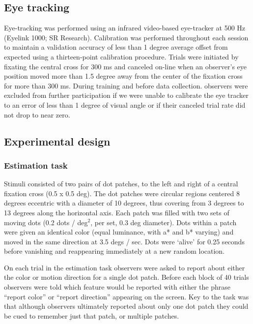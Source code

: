 \documentclass{report}
\begin{document}
\subsection{Eye tracking}

Eye-tracking was performed using an infrared video-based eye-tracker at 500 Hz (Eyelink 1000; SR Research). Calibration was performed throughout each session to maintain a validation accuracy of less than 1 degree average offset from expected using a thirteen-point calibration procedure. Trials were initiated by fixating the central cross for 300 ms and canceled on-line when an observer’s eye position moved more than 1.5 degree away from the center of the fixation cross for more than 300 ms. During training and before data collection. observers were excluded from further participation if we were unable to calibrate the eye tracker to an error of less than 1 degree of visual angle or if their canceled trial rate did not drop to near zero.

\subsection{Experimental design}

\subsubsection{Estimation task}

Stimuli consisted of two pairs of dot patches, to the left and right of a central fixation cross (0.5 x 0.5 deg). The dot patches were circular regions centered 8 degrees eccentric with a diameter of 10 degrees, thus covering from 3 degrees to 13 degrees along the horizontal axis. Each patch was filled with two sets of moving dots (0.2 dots / deg$^2$, per set, 0.3 deg diameter). Dots within a patch were given an identical color (equal luminance, with a* and b* varying) and moved in the same direction at 3.5 degs / sec. Dots were `alive' for 0.25 seconds before vanishing and reappearing immediately at a new random location.

On each trial in the estimation task observers were asked to report about either the color or motion direction for a single dot patch. Before each block of 40 trials observers were told which feature would be reported with either the phrase ``report color'' or ``report direction'' appearing on the screen. Key to the task was that although observers ultimately reported about only one dot patch they could be cued to remember just that patch, or multiple patches. 
\end{document}
